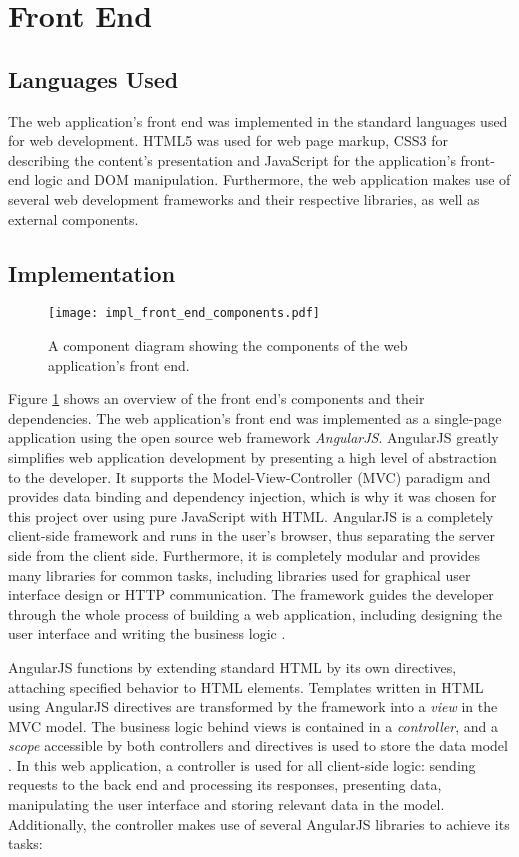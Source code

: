\section{Front End}
\subsection{Languages Used}
The web application's front end was implemented in the standard languages used for web development. HTML5 was used for web page markup, CSS3 for describing the content's presentation and JavaScript for the application's front-end logic and DOM manipulation. Furthermore, the web application makes use of several web development frameworks and their respective libraries, as well as external components.

\subsection{Implementation}
\begin{figure}
	\centering
	\texttt{[image: impl\_front\_end\_components.pdf]}
	\caption{A component diagram showing the components of the web application's front end.}
	\label{fig:front_end_components}
\end{figure}
Figure \ref{fig:front_end_components} shows an overview of the front end's components and their dependencies. The web application's front end was implemented as a single-page application using the open source web framework \textit{AngularJS}. AngularJS greatly simplifies web application development by presenting a high level of abstraction to the developer. It supports the Model-View-Controller (MVC) paradigm and provides data binding and dependency injection, which is why it was chosen for this project over using pure JavaScript with HTML. AngularJS is a completely client-side framework and runs in the user's browser, thus separating the server side from the client side. Furthermore, it is completely modular and provides many libraries for common tasks, including libraries used for graphical user interface design or HTTP communication. The framework guides the developer through the whole process of building a web application, including designing the user interface and writing the business logic \cite{angularjs-guide}.

AngularJS functions by extending standard HTML by its own directives, attaching specified behavior to HTML elements. Templates written in HTML using AngularJS directives are transformed by the framework into a \textit{view} in the MVC model. The business logic behind views is contained in a \textit{controller}, and a \textit{scope} accessible by both controllers and directives is used to store the data model \cite{angularjs-guide}. In this web application, a controller is used for all client-side logic: sending requests to the back end and processing its responses, presenting data, manipulating the user interface and storing relevant data in the model. Additionally, the controller makes use of several AngularJS libraries to achieve its tasks:


